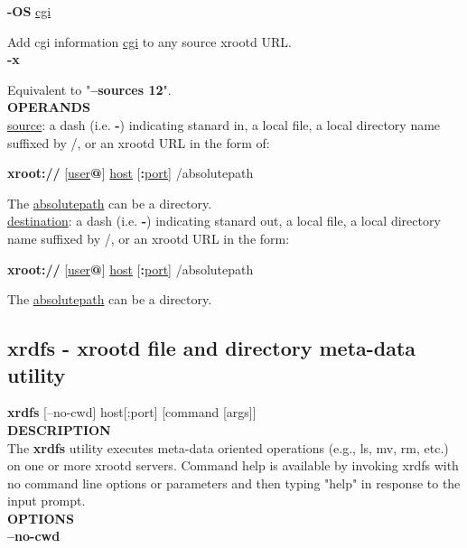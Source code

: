 \documentclass{article}
\begin{document}
		\noindent \textbf{-OS} \underline{cgi}

		\noindent Add cgi information \underline{cgi} to any source xrootd URL. \\
		
		\noindent \textbf{-x}

		\noindent Equivalent to "\textbf{--sources 12}". \\
		
		\noindent \textbf{OPERANDS} \\
		
		\noindent \underline{source}: a dash (i.e. \textbf{-}) indicating stanard in, a local file, a local directory 
		name suffixed by /, or an xrootd URL in the form of:
		
		\textbf{xroot://} [\underline{user}\textbf{@}] \underline{host} [\textbf{:}\underline{port}] /absolutepath
		
		\noindent The \underline{absolutepath} can be a directory. \\
		
		\noindent \underline{destination}: a dash (i.e. \textbf{-}) indicating stanard out, a local file, a local directory
		name suffixed by /, or an xrootd URL in the form:

		\textbf{xroot://} [\underline{user}\textbf{@}] \underline{host} [\textbf{:}\underline{port}] /absolutepath

		\noindent The \underline{absolutepath} can be a directory.
		
    \subsection{xrdfs - xrootd file and directory meta-data utility}
    
		\textbf{xrdfs} [--no-cwd] host[:port] [command [args]] \\
		
		\noindent \textbf{DESCRIPTION} \\
		
		The \textbf{xrdfs} utility executes meta-data oriented operations (e.g., ls, mv, rm, etc.) on one or more xrootd servers.
		Command help is available by invoking xrdfs with no command line options or parameters and then typing "help" in response
		to the input prompt. \\
		
		\noindent \textbf{OPTIONS} \\
		
		\noindent \textbf{--no-cwd}
		
\end{document}
